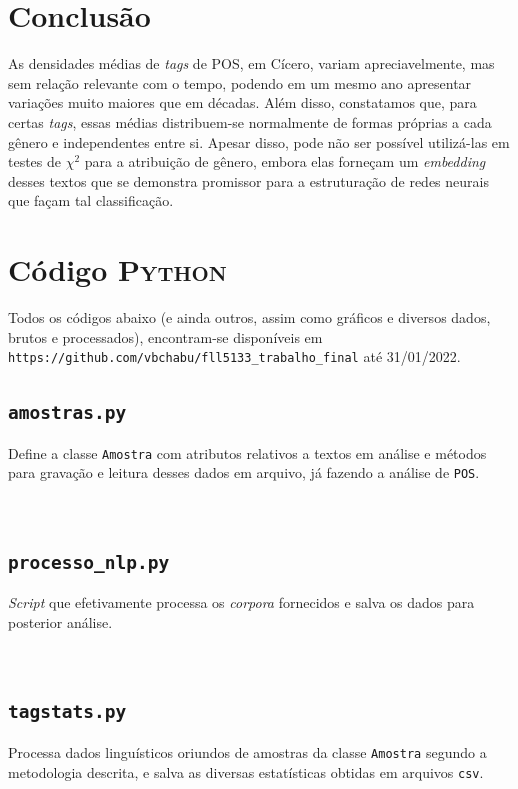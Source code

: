 \documentclass[10pt,a4paper,onecolumn]{article}
\theoremstyle{definition}
\theoremstyle{remark}
\begin{document}
\section{Conclusão}
As densidades médias de \emph{tags} de POS, em Cícero, variam apreciavelmente, mas sem relação relevante com o tempo, podendo em um mesmo ano apresentar variações muito maiores que em décadas. Além disso, constatamos que, para certas \emph{tags}, essas médias distribuem-se normalmente de formas próprias a cada gênero e independentes entre si. Apesar disso, pode não ser possível utilizá-las em testes de $\chi^2$ para a atribuição de gênero, embora elas forneçam um \emph{embedding} desses textos que se demonstra promissor para a estruturação de redes neurais que façam tal classificação.

\appendix
\newpage
\section{Código \textsc{Python}}\label{ap:python}
\noindent
Todos os códigos abaixo (e ainda outros, assim como gráficos e diversos dados, brutos e processados), encontram-se disponíveis em \texttt{https://github.com/vbchabu/fll5133\_trabalho\_final} até 31/01/2022.

\subsection{\texttt{amostras.py}}
\noindent
Define a classe \texttt{Amostra} com atributos relativos a textos em análise e métodos para gravação e leitura desses dados em arquivo, já fazendo a análise de \texttt{POS}.

\

\subsection{\texttt{processo\_nlp.py}}
\noindent
\emph{Script} que efetivamente processa os \emph{corpora} fornecidos e salva os dados para posterior análise.

\

\subsection{\texttt{tagstats.py}}\label{ap:tagstats}
\noindent
Processa dados linguísticos oriundos de amostras da classe \texttt{Amostra} segundo a metodologia descrita, e salva as diversas estatísticas obtidas em arquivos \texttt{csv}.

\
\end{document}
